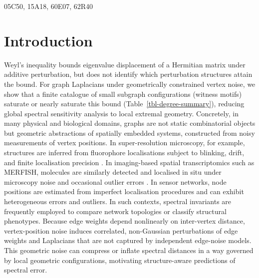 \documentclass[
  11pt,
  letterpaper]{siamart251216}
\begin{document}
\begin{MSCcodes}
05C50, 15A18, 60E07, 62R40
\end{MSCcodes}

\section{Introduction}\label{sec-intro}

Weyl's inequality bounds eigenvalue displacement of a Hermitian matrix
under additive perturbation, but does not identify which perturbation
structures attain the bound. For graph Laplacians under geometrically
constrained vertex noise, we show that a finite catalogue of small
subgraph configurations (witness motifs) saturate or nearly saturate
this bound (Table~\ref{tbl-degree-summary}), reducing global spectral
sensitivity analysis to local extremal geometry. Concretely, in many
physical and biological domains, graphs are not static combinatorial
objects but geometric abstractions of spatially embedded systems,
constructed from noisy measurements of vertex positions. In
super-resolution microscopy, for example, structures are inferred from
fluorophore localisations subject to blinking, drift, and finite
localisation precision \citep{Rust2006}. In imaging-based spatial
transcriptomics such as MERFISH, molecules are similarly detected and
localised in situ under microscopy noise and occasional outlier errors
\citep{Chen2015MERFISH}. In sensor networks, node positions are
estimated from imperfect localisation procedures and can exhibit
heterogeneous errors and outliers. In such contexts, spectral invariants
are frequently employed to compare network topologies or classify
structural phenotypes. Because edge weights depend nonlinearly on
inter-vertex distance, vertex-position noise induces correlated,
non-Gaussian perturbations of edge weights and Laplacians that are not
captured by independent edge-noise models. This geometric noise can
compress or inflate spectral distances in a way governed by local
geometric configurations, motivating structure-aware predictions of
spectral error.
\end{document}
